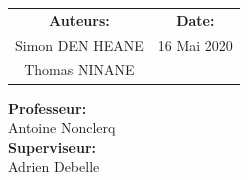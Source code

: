 \documentclass[11pt, a4paper]{article}  %
\begin{document}
\begin{center}
	\vspace{1.5 cm}
	\setlength{\tabcolsep}{60pt}
	   \begin{tabular}{cc}
    	    \textbf{Auteurs:} & \textbf{Date:} \\
    	    Simon DEN HEANE & 16 Mai 2020\\
    	    Thomas NINANE & 
    	    \vspace{2cm}
	    \end{tabular} 
	\setlength{\tabcolsep}{6pt}
	
	\vspace{-0.5cm}
	\textbf{Professeur:}\\
    Antoine Nonclerq\\
    
    \vspace{0.5cm}
    \textbf{Superviseur:}\\
    Adrien Debelle
	
\end{center}

\newpage
{}
\tableofcontents

\newpage
{}




%
\end{document}
